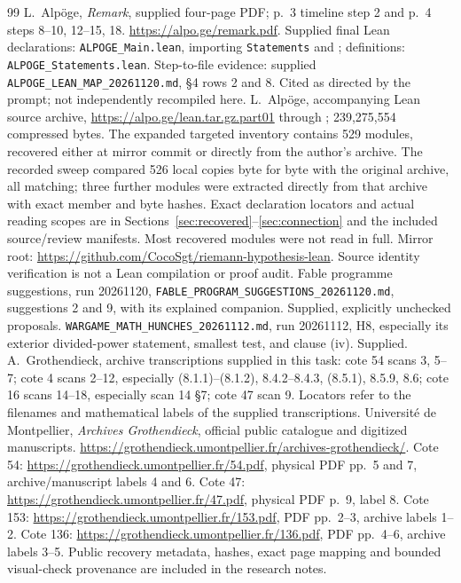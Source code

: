 \documentclass[11pt,a4paper]{article}
\theoremstyle{definition}\newtheorem{remark}[theorem]{Remark}
\begin{document}
\begin{thebibliography}{99}
 L.~Alp\"oge, \emph{Remark}, supplied four-page PDF; p.~3 timeline step 2 and p.~4 steps 8--10, 12--15, 18. \url{https://alpo.ge/remark.pdf}. Supplied final Lean declarations: \texttt{ALPOGE\_Main.lean}, importing \texttt{Statements} and ; definitions: \texttt{ALPOGE\_Statements.lean}. Step-to-file evidence: supplied \texttt{ALPOGE\_LEAN\_MAP\_20261120.md}, \S4 rows 2 and 8. Cited as directed by the prompt; not independently recompiled here.
 L.~Alp\"oge, accompanying Lean source archive, \url{https://alpo.ge/lean.tar.gz.part01} through ; 239,275,554 compressed bytes. The expanded targeted inventory contains 529 modules, recovered either at mirror commit  or directly from the author's archive. The recorded sweep compared 526 local copies byte for byte with the original archive, all matching; three further modules were extracted directly from that archive with exact member and byte hashes. Exact declaration locators and actual reading scopes are in Sections~\ref{sec:recovered}--\ref{sec:connection} and the included source/review manifests. Most recovered modules were not read in full. Mirror root: \url{https://github.com/CocoSgt/riemann-hypothesis-lean}. Source identity verification is not a Lean compilation or proof audit.
 Fable programme suggestions, run 20261120, \texttt{FABLE\_PROGRAM\_SUGGESTIONS\_20261120.md}, suggestions 2 and 9, with its explained companion. Supplied, explicitly unchecked proposals.
 \texttt{WARGAME\_MATH\_HUNCHES\_20261112.md}, run 20261112, H8, especially its exterior divided-power statement, smallest test, and clause (iv). Supplied.
 A.~Grothendieck, archive transcriptions supplied in this task: cote 54 scans 3, 5--7; cote 4 scans 2--12, especially (8.1.1)--(8.1.2), 8.4.2--8.4.3, (8.5.1), 8.5.9, 8.6; cote 16 scans 14--18, especially scan 14 \S7; cote 47 scan 9. Locators refer to the filenames and mathematical labels of the supplied transcriptions.
 Universit\'e de Montpellier, \emph{Archives Grothendieck}, official public catalogue and digitized manuscripts. \url{https://grothendieck.umontpellier.fr/archives-grothendieck/}. Cote 54: \url{https://grothendieck.umontpellier.fr/54.pdf}, physical PDF pp.~5 and 7, archive/manuscript labels 4 and 6. Cote 47: \url{https://grothendieck.umontpellier.fr/47.pdf}, physical PDF p.~9, label 8. Cote 153: \url{https://grothendieck.umontpellier.fr/153.pdf}, PDF pp.~2--3, archive labels 1--2. Cote 136: \url{https://grothendieck.umontpellier.fr/136.pdf}, PDF pp.~4--6, archive labels 3--5. Public recovery metadata, hashes, exact page mapping and bounded visual-check provenance are included in the research notes.

\end{thebibliography}
\end{document}
